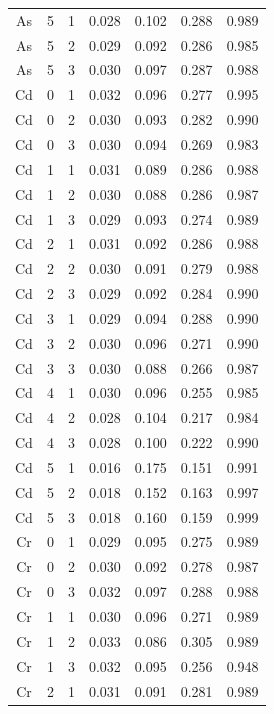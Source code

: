 \documentclass[ms, hidelinks]{uncgdissertationexp3}
\theoremstyle{plain}
\theoremstyle{definition}
\theoremstyle{remark}
\begin{document}
\begin{longtable}{ccccccc}
  As & 5 & 1 & 0.028 & 0.102 & 0.288 & 0.989\\
  \rowcolor{gray!6}  As & 5 & 2 & 0.029 & 0.092 & 0.286 & 0.985\\
  As & 5 & 3 & 0.030 & 0.097 & 0.287 & 0.988\\
  \rowcolor{gray!6}  Cd & 0 & 1 & 0.032 & 0.096 & 0.277 & 0.995\\
  Cd & 0 & 2 & 0.030 & 0.093 & 0.282 & 0.990\\
  \rowcolor{gray!6}  Cd & 0 & 3 & 0.030 & 0.094 & 0.269 & 0.983\\
  Cd & 1 & 1 & 0.031 & 0.089 & 0.286 & 0.988\\
  \rowcolor{gray!6}  Cd & 1 & 2 & 0.030 & 0.088 & 0.286 & 0.987\\
  Cd & 1 & 3 & 0.029 & 0.093 & 0.274 & 0.989\\
  \rowcolor{gray!6}  Cd & 2 & 1 & 0.031 & 0.092 & 0.286 & 0.988\\
  Cd & 2 & 2 & 0.030 & 0.091 & 0.279 & 0.988\\
  \rowcolor{gray!6}  Cd & 2 & 3 & 0.029 & 0.092 & 0.284 & 0.990\\
  Cd & 3 & 1 & 0.029 & 0.094 & 0.288 & 0.990\\
  \rowcolor{gray!6}  Cd & 3 & 2 & 0.030 & 0.096 & 0.271 & 0.990\\
  Cd & 3 & 3 & 0.030 & 0.088 & 0.266 & 0.987\\
  \rowcolor{gray!6}  Cd & 4 & 1 & 0.030 & 0.096 & 0.255 & 0.985\\
  Cd & 4 & 2 & 0.028 & 0.104 & 0.217 & 0.984\\
  \rowcolor{gray!6}  Cd & 4 & 3 & 0.028 & 0.100 & 0.222 & 0.990\\
  Cd & 5 & 1 & 0.016 & 0.175 & 0.151 & 0.991\\
  \rowcolor{gray!6}  Cd & 5 & 2 & 0.018 & 0.152 & 0.163 & 0.997\\
  Cd & 5 & 3 & 0.018 & 0.160 & 0.159 & 0.999\\
  \rowcolor{gray!6}  Cr & 0 & 1 & 0.029 & 0.095 & 0.275 & 0.989\\
  Cr & 0 & 2 & 0.030 & 0.092 & 0.278 & 0.987\\
  \rowcolor{gray!6}  Cr & 0 & 3 & 0.032 & 0.097 & 0.288 & 0.988\\
  Cr & 1 & 1 & 0.030 & 0.096 & 0.271 & 0.989\\
  \rowcolor{gray!6}  Cr & 1 & 2 & 0.033 & 0.086 & 0.305 & 0.989\\
  Cr & 1 & 3 & 0.032 & 0.095 & 0.256 & 0.948\\
  \rowcolor{gray!6}  Cr & 2 & 1 & 0.031 & 0.091 & 0.281 & 0.989\\

\end{longtable}
\end{document}
